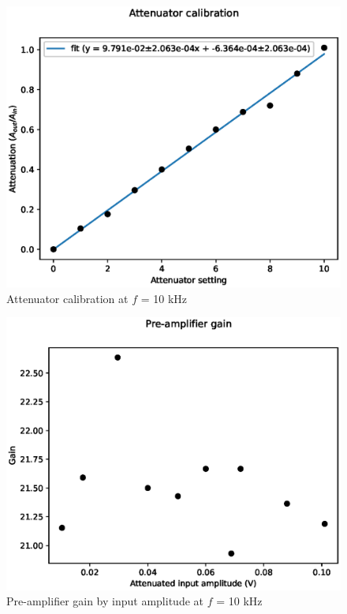 \documentclass[a4paper]{article}
\begin{document}
\begin{appendices}
\begin{figure}[ht!]
\centering
\includegraphics[width=\textwidth]{fig/python/attenuator}
\caption{Attenuator calibration at $f$ = 10 kHz}
\label{fig:attenuator}
\end{figure}

\begin{figure}[ht!]
\centering
\includegraphics[width=\textwidth]{fig/python/preamp_gain}
\caption{Pre-amplifier gain by input amplitude at $f$ = 10 kHz}
\label{fig:pre_amp_gain}
\end{figure}


\end{appendices}
\end{document}
